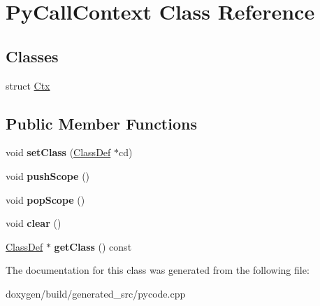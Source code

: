 \hypertarget{class_py_call_context}{}\section{Py\+Call\+Context Class Reference}
\label{class_py_call_context}
\subsection*{Classes}
\begin{DoxyCompactItemize}
\item 
struct \mbox{\hyperlink{struct_py_call_context_1_1_ctx}{Ctx}}
\end{DoxyCompactItemize}
\subsection*{Public Member Functions}
\begin{DoxyCompactItemize}
\item 
\mbox{\label{class_py_call_context_a5aa0259d9af92a26ca91c9ae9eaafa50}} 
void {\bfseries set\+Class} (\mbox{\hyperlink{class_class_def}{Class\+Def}} $\ast$cd)
\item 
\mbox{\label{class_py_call_context_ad91c5d2cf8278cd9bfb95644dff22428}} 
void {\bfseries push\+Scope} ()
\item 
\mbox{\label{class_py_call_context_a07828922123391baa0bb455ea053e98d}} 
void {\bfseries pop\+Scope} ()
\item 
\mbox{\label{class_py_call_context_a4ed1bfbe6c61ae48b4c65452d9f245d3}} 
void {\bfseries clear} ()
\item 
\mbox{\label{class_py_call_context_a9e999bc9d02b7d333677a497d683c1b6}} 
\mbox{\hyperlink{class_class_def}{Class\+Def}} $\ast$ {\bfseries get\+Class} () const
\end{DoxyCompactItemize}


The documentation for this class was generated from the following file\+:\begin{DoxyCompactItemize}
\item 
doxygen/build/generated\+\_\+src/pycode.\+cpp\end{DoxyCompactItemize}
